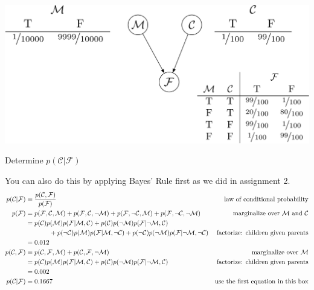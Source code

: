 \documentclass{tufte-handout}
\begin{document}
\begin{exercise}
\begin{center}
\includegraphics[width=0.6\linewidth]{figures/medicaldiagnosis}
\end{center}
\bes
\item Determine $p(\mathcal{C}|\mathcal{F})$
\begin{boxedsolution}
You can also do this by applying Bayes' Rule first as we did in assignment 2.
\begin{align}
p(\mathcal{C}|\mathcal{F}) &= \frac{p(\mathcal{C}, \mathcal{F})}{p(\mathcal{F})} & \mbox{law of conditional probability} \nonumber \\
p(\mathcal{F}) &= p(\mathcal{F}, \mathcal{C}, \mathcal{M}) + p(\mathcal{F}, \mathcal{C}, \neg \mathcal{M}) + p(\mathcal{F}, \neg \mathcal{C}, \mathcal{M}) + p(\mathcal{F}, \neg \mathcal{C}, \neg \mathcal{M}) &\mbox{marginalize over $\mathcal{M}$ and $\mathcal{C}$}\nonumber \\
&= p(\mathcal{C})p(\mathcal{M})p(\mathcal{F}|\mathcal{M},\mathcal{C}) + p(\mathcal{C})p(\neg \mathcal{M})p(\mathcal{F}|\neg \mathcal{M},\mathcal{C}) \nonumber \\
&\hspace{0.5in}+p(\neg \mathcal{C})p(\mathcal{M})p(\mathcal{F}|\mathcal{M},\neg \mathcal{C}) +p(\neg \mathcal{C})p(\neg \mathcal{M})p(\mathcal{F}|\neg \mathcal{M},\neg \mathcal{C}) & \mbox{factorize: children given parents} \nonumber \\
&= 0.012 \nonumber \\
p(\mathcal{C}, \mathcal{F}) &= p(\mathcal{C}, \mathcal{F}, \mathcal{M})  + p(\mathcal{C}, \mathcal{F}, \neg \mathcal{M}) &\mbox{marginalize over $\mathcal{M}$} \nonumber \\
&= p(\mathcal{C})p(\mathcal{M}) p(\mathcal{F}|\mathcal{M}, \mathcal{C}) + p(\mathcal{C})p(\neg \mathcal{M}) p(\mathcal{F}| \neg \mathcal{M}, \mathcal{C})& \mbox{factorize: children given parents} \nonumber \\
&= 0.002 \nonumber \\
p(\mathcal{C}|\mathcal{F}) &=  0.1667 &\mbox{use the first equation in this box} \nonumber
\end{align}
\end{boxedsolution}

\end{exercise}
\end{document}
